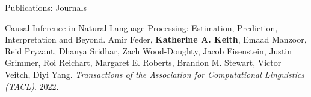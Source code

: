 \documentclass{resume} %
\begin{document}
%
\begin{rSection}{Publications: Journals}
\begin{etaremune}

\item Causal Inference in Natural Language Processing: Estimation, Prediction, Interpretation and Beyond. Amir Feder, \textbf{Katherine A. Keith}, Emaad Manzoor, Reid Pryzant, Dhanya Sridhar, Zach Wood-Doughty, Jacob Eisenstein, Justin Grimmer, Roi Reichart, Margaret E. Roberts, Brandon M. Stewart, Victor Veitch, Diyi Yang. \emph{Transactions of the Association for Computational Linguistics (TACL)}. 2022. 

\end{etaremune}
\end{rSection}
\end{document}
